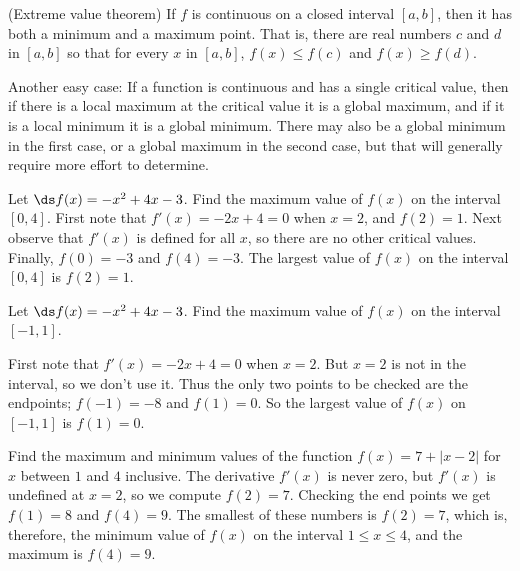 \begin{theorem} (Extreme value theorem) 
\label{thm:evt}
If $f$ is continuous on a closed interval
$[a,b]$, then it has both a minimum and a maximum point. That is,
there are real numbers $c$ and $d$ in $[a,b]$ so that 
for every $x$ in $[a,b]$, $f(x)\le f(c)$ and $f(x)\ge f(d)$.
\end{theorem}

Another easy case: If a function is
continuous and has a single critical value, then if there is a local
maximum at the critical value it is a global maximum, and if it is a
local minimum it is a global minimum. There may also be a global
minimum in the first case, or a global maximum in the second case, but
that will generally require more effort to determine.

\begin{example}
 Let $\ds f(x)=-x^2+4x-3$. 
Find the maximum value of $f(x)$ on the interval $[0,4]$.
First note that $f'(x)= -2 x +4=0$ when $x=2$, and $f(2)= 1$.
Next observe that $f'(x)$ is defined for all $x$, so there are no
other critical values.
Finally, $f(0) = -3$ and $f(4)= -3$. The largest value of
$f(x)$ on the interval $[0,4]$ is $f(2)=1$.
\end{example}

\begin{example}
Let $\ds f(x)=-x^2+4x-3$. Find the maximum value of $f(x)$ on the interval
$[-1,1]$.

First note that $f'(x)= -2 x +4=0$ when $x=2$. But $x=2$ is not in the
interval, so we don't use it.
Thus the only two points to be checked are the endpoints;
$f(-1) = -8$ and $f(1)= 0$. So the largest value of
$f(x)$ on $[-1,1]$ is $f(1)=0$.
\end{example}

\begin{example}
Find the maximum and minimum values of the function $f(x)= 7+|x-2|$ for
$x$ between $1$ and $4$ inclusive.
The derivative $f'(x)$ is never zero, but $f'(x)$ is undefined at $x=2$,
so we compute $f(2)= 7$. Checking the end points we get $f(1)=8$ and
$f(4)=9$. The smallest of these numbers is $f(2)=7$, which is, therefore,
the minimum value of $f(x)$ on the interval $1 \le x \le 4$, and the
maximum is $f(4)=9$.
\end{example}

